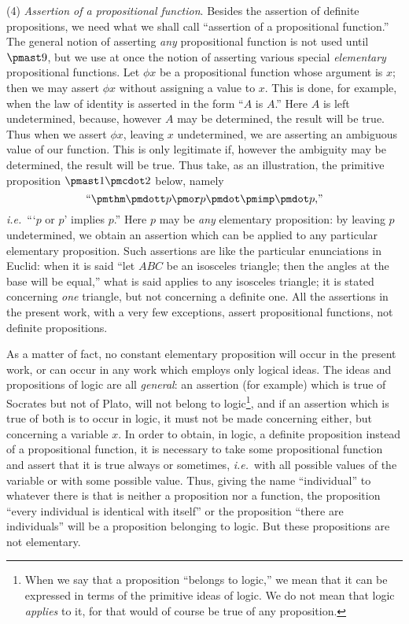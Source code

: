 \documentclass[letterpaper,12pt,openany,leqno]{book}
\newcommand{\pagefirst}[1]{\marginnote[\boxed{\text{#1}}]{\boxed{\text{#1}}}}
\begin{document}
(4) \textit{Assertion of a propositional function}. Besides the assertion of definite propositions, we need what we shall call ``assertion of a propositional function.'' The general notion of asserting \textit{any} propositional function is not used until $\pmast9$, but we use at once the notion of asserting various special \textit{elementary} propositional functions. Let $\phi x$ be a propositional function whose argument is $x$; then we may assert $\phi x$ without assigning a value to $x$. \pagefirst{97} This is done, for example, when the law of identity is asserted in the form ``$A$ is $A$.'' Here $A$ is left undetermined, because, however $A$ may be determined, the result will be true. Thus when we assert $\phi x$, leaving $x$ undetermined, we are asserting an ambiguous value of our function. This is only legitimate if, however the ambiguity may be determined, the result will be true. Thus take, as an illustration, the primitive proposition $\pmast1\pmcdot2$ below, namely
\[
	\text{``} \pmthm \pmdott p \pmor p \pmdot \pmimp \pmdot p\text{,''}
\]
\textit{i.e.}\ ```$p$ or $p$' implies $p$.'' Here $p$ may be \textit{any} elementary proposition: by leaving $p$ undetermined, we obtain an assertion which can be applied to any particular elementary proposition. Such assertions are like the particular enunciations in Euclid: when it is said ``let $ABC$ be an isosceles triangle; then the angles at the base will be equal,'' what is said applies to any isosceles triangle; it is stated concerning \textit{one} triangle, but not concerning a definite one. All the assertions in the present work, with a very few exceptions, assert propositional functions, not definite propositions.

As a matter of fact, no constant elementary proposition will occur in the present work, or can occur in any work which employs only logical ideas. The ideas and propositions of logic are all \textit{general}: an assertion (for example) which is true of Socrates but not of Plato, will not belong to logic\footnote{When we say that a proposition ``belongs to logic,'' we mean that it can be expressed in terms of the primitive ideas of logic. We do not mean that logic \textit{applies} to it, for that would of course be true of any proposition.}, and if an assertion which is true of both is to occur in logic, it must not be made concerning either, but concerning a variable $x$. In order to obtain, in logic, a definite proposition instead of a propositional function, it is necessary to take some propositional function and assert that it is true always or sometimes, \textit{i.e.}\ with all possible values of the variable or with some possible value. Thus, giving the name ``individual'' to whatever there is that is neither a proposition nor a function, the proposition ``every individual is identical with itself'' or the proposition ``there are individuals'' will be a proposition belonging to logic. But these propositions are not elementary.
\end{document}
